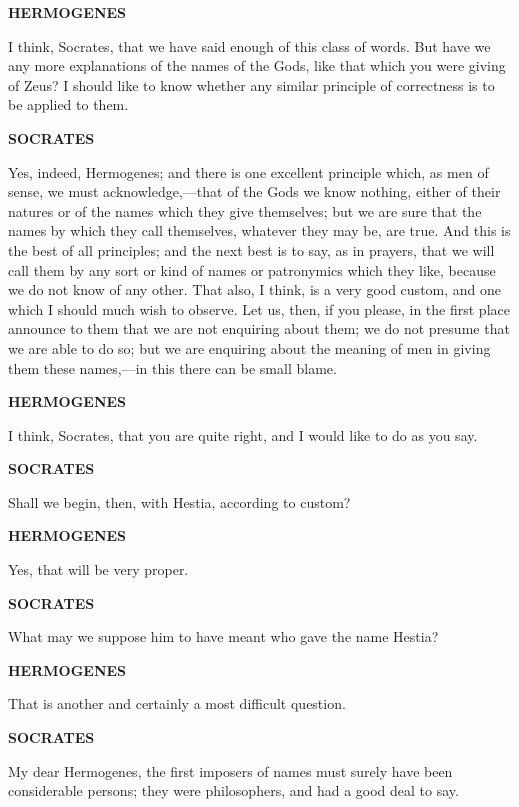 \documentclass[11pt,letter]{article}
\begin{document}
\par \textbf{HERMOGENES}
\par   I think, Socrates, that we have said enough of this class of words. But have we any more explanations of the names of the Gods, like that which you were giving of Zeus? I should like to know whether any similar principle of correctness is to be applied to them.

\par \textbf{SOCRATES}
\par   Yes, indeed, Hermogenes; and there is one excellent principle which, as men of sense, we must acknowledge,—that of the Gods we know nothing, either of their natures or of the names which they give themselves; but we are sure that the names by which they call themselves, whatever they may be, are true. And this is the best of all principles; and the next best is to say, as in prayers, that we will call them by any sort or kind of names or patronymics which they like, because we do not know of any other. That also, I think, is a very good custom, and one which I should much wish to observe. Let us, then, if you please, in the first place announce to them that we are not enquiring about them; we do not presume that we are able to do so; but we are enquiring about the meaning of men in giving them these names,—in this there can be small blame.

\par \textbf{HERMOGENES}
\par   I think, Socrates, that you are quite right, and I would like to do as you say.

\par \textbf{SOCRATES}
\par   Shall we begin, then, with Hestia, according to custom?

\par \textbf{HERMOGENES}
\par   Yes, that will be very proper.

\par \textbf{SOCRATES}
\par   What may we suppose him to have meant who gave the name Hestia?

\par \textbf{HERMOGENES}
\par   That is another and certainly a most difficult question.

\par \textbf{SOCRATES}
\par   My dear Hermogenes, the first imposers of names must surely have been considerable persons; they were philosophers, and had a good deal to say.
\end{document}
